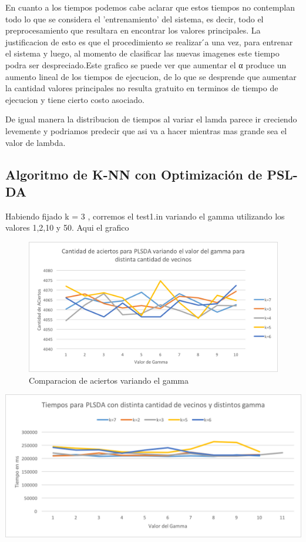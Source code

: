En cuanto a los tiempos podemos cabe aclarar que estos tiempos no contemplan todo lo que se considera el ’entrenamiento’ del sistema, es decir, todo el preprocesamiento que resultara en encontrar
los valores principales. La justificacion de esto es que el procedimiento se realizar ́a una vez, para entrenar el sistema y luego, al momento de clasificar las
nuevas imagenes este tiempo podra ser despreciado.Este grafico se puede ver que aumentar el α produce un aumento lineal de los tiempos de ejecucion, 
de lo que se desprende que aumentar la cantidad valores principales no resulta gratuito en terminos de tiempo de ejecucion y tiene cierto costo asociado.

De igual manera la distribucion de tiempos al variar el lamda parece ir creciendo levemente y podriamos predecir que asi va a hacer mientras mas grande sea el valor de lambda.

\subsection {Algoritmo de K-NN con Optimización de PSL-DA}
Habiendo fijado k = 3 , corremos el test1.in variando el gamma utilizando los valores 1,2,10 y 50. Aqui el grafico
\begin{figure}[H]
\centering
\includegraphics[width=1\textwidth]{imagenes/AciertosPLSDA.png}
\caption{Comparacion de aciertos variando el gamma}
\label{fig:Comparacion de tecnicas}
\end{figure}


\begin{center}
\includegraphics[scale=0.6]{imagenes/TiemposPLSDA.png}
\end{center}

